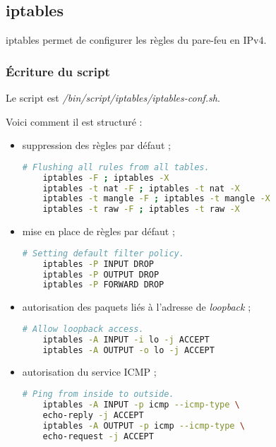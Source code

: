 \subsection{iptables}
\label{subsec:iptables}

iptables permet de configurer les règles du pare-feu en IPv4.

\subsubsection{Écriture du script}
\label{subsubsec:ecriture-script}

Le script est \textit{/bin/script/iptables/iptables-conf.sh}.

Voici comment il est structuré :

\begin{itemize}
\item suppression des règles par défaut ;

  \begin{lstlisting}[language=bash]
    # Flushing all rules from all tables.
    iptables -F ; iptables -X
    iptables -t nat -F ; iptables -t nat -X
    iptables -t mangle -F ; iptables -t mangle -X
    iptables -t raw -F ; iptables -t raw -X
  \end{lstlisting}

\item mise en place de règles par défaut ;

  \begin{lstlisting}[language=bash]
    # Setting default filter policy.
    iptables -P INPUT DROP
    iptables -P OUTPUT DROP
    iptables -P FORWARD DROP
  \end{lstlisting}

\item autorisation des paquets liés à l'adresse de \textit{loopback} ;

  \begin{lstlisting}[language=bash]
    # Allow loopback access.
    iptables -A INPUT -i lo -j ACCEPT
    iptables -A OUTPUT -o lo -j ACCEPT
  \end{lstlisting}

\item autorisation du service ICMP ;

  \begin{lstlisting}[language=bash]
    # Ping from inside to outside.
    iptables -A INPUT -p icmp --icmp-type \
    echo-reply -j ACCEPT
    iptables -A OUTPUT -p icmp --icmp-type \
    echo-request -j ACCEPT
  \end{lstlisting}


\end{itemize}
